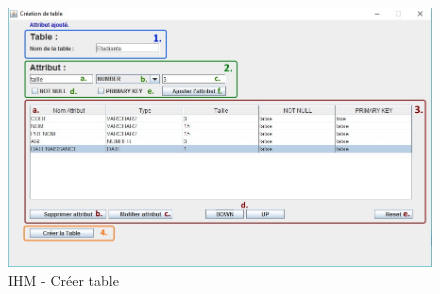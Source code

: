 \begin{figure}[!h]
\centering
\includegraphics[width=14cm]{./images/manuel/creer_table.jpg}
\caption{IHM - Créer table}
\label{creer_table_gui}
\end{figure}

